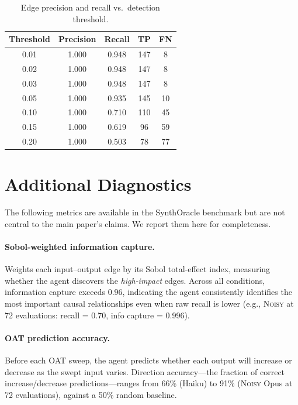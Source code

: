 \documentclass[11pt,letterpaper]{article}
\newcommand{\oracle}[1]{\textsc{#1}}
\newcommand{\noisy}{\oracle{Noisy}}
\begin{document}
\begin{table}[h]
\centering
\caption{Edge precision and recall vs.\ detection threshold.}
\label{tab:threshold}
\small
\begin{tabular}{@{}ccccc@{}}
\toprule
Threshold & Precision & Recall & TP & FN \\
\midrule
0.01 & 1.000 & 0.948 & 147 & 8 \\
0.02 & 1.000 & 0.948 & 147 & 8 \\
0.03 & 1.000 & 0.948 & 147 & 8 \\
0.05 & 1.000 & 0.935 & 145 & 10 \\
0.10 & 1.000 & 0.710 & 110 & 45 \\
0.15 & 1.000 & 0.619 & 96 & 59 \\
0.20 & 1.000 & 0.503 & 78 & 77 \\
\bottomrule
\end{tabular}
\end{table}

\section{Additional Diagnostics}
\label{app:additional_diagnostics}

The following metrics are available in the SynthOracle benchmark but are
not central to the main paper's claims. We report them here for
completeness.

\paragraph{Sobol-weighted information capture.} Weights each
input--output edge by its Sobol total-effect index, measuring whether
the agent discovers the \emph{high-impact} edges. Across all conditions,
information capture exceeds 0.96, indicating the agent consistently
identifies the most important causal relationships even when raw recall
is lower (e.g., \noisy{} at 72 evaluations: recall = 0.70, info capture
= 0.996).

\paragraph{OAT prediction accuracy.} Before each OAT sweep, the agent
predicts whether each output will increase or decrease as the swept
input varies. Direction accuracy---the fraction of correct
increase/decrease predictions---ranges from 66\% (Haiku) to 91\%
(\noisy{} Opus at 72 evaluations), against a 50\% random baseline.
\end{document}
